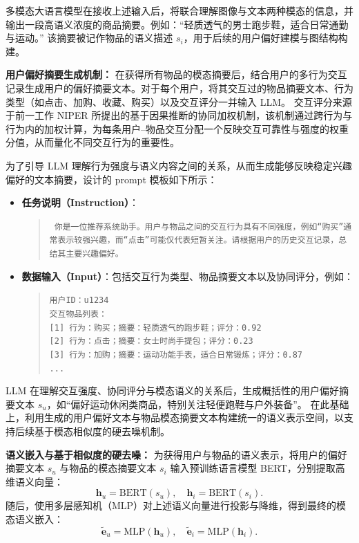 多模态大语言模型在接收上述输入后，将联合理解图像与文本两种模态的信息，并输出一段高语义浓度的商品摘要。例如：“轻质透气的男士跑步鞋，适合日常通勤与运动。”  
该摘要被记作物品的语义描述 $s_i$，用于后续的用户偏好建模与图结构构建。

\textbf{用户偏好摘要生成机制：}  
在获得所有物品的模态摘要后，结合用户的多行为交互记录生成用户的偏好摘要文本。对于每个用户，将其交互过的物品摘要文本、行为类型（如点击、加购、收藏、购买）以及交互评分一并输入 LLM。  
交互评分来源于前一工作 NIPER 所提出的基于因果推断的协同加权机制，该机制通过跨行为与行为内的加权计算，为每条用户–物品交互分配一个反映交互可靠性与强度的权重分值，从而量化不同交互行为的重要性。

为了引导 LLM 理解行为强度与语义内容之间的关系，从而生成能够反映稳定兴趣偏好的文本摘要，设计的 prompt 模板如下所示：
\begin{itemize}
    \item \textbf{任务说明（Instruction）}：
    \begin{quote}
        \texttt{
        你是一位推荐系统助手。用户与物品之间的交互行为具有不同强度，例如“购买”通常表示较强兴趣，而“点击”可能仅代表短暂关注。请根据用户的历史交互记录，总结其主要兴趣偏好。
        }
    \end{quote}

    \item \textbf{数据输入（Input）}：包括交互行为类型、物品摘要文本以及协同评分，例如：
    \begin{quote}
        \texttt{用户ID：u1234}\\
        \texttt{交互物品列表：}\\
        \texttt{[1] 行为：购买；摘要：轻质透气的跑步鞋；评分：0.92}\\
        \texttt{[2] 行为：点击；摘要：女士时尚手提包；评分：0.23}\\
        \texttt{[3] 行为：加购；摘要：运动功能手表，适合日常锻炼；评分：0.87}\\
        \texttt{...}
    \end{quote}
\end{itemize}

LLM 在理解交互强度、协同评分与模态语义的关系后，生成概括性的用户偏好摘要文本 $s_u$，如“偏好运动休闲类商品，特别关注轻便跑鞋与户外装备”。  
在此基础上，利用生成的用户偏好文本与物品模态摘要文本构建统一的语义表示空间，以支持后续基于模态相似度的硬去噪机制。

\textbf{语义嵌入与基于相似度的硬去噪：}  
为获得用户与物品的语义表示，将用户的偏好摘要文本 $s_u$ 与物品的模态摘要文本 $s_i$ 输入预训练语言模型 BERT，分别提取高维语义向量：
\begin{equation}
\mathbf{h}_u = \mathrm{BERT}(s_u), \quad \mathbf{h}_i = \mathrm{BERT}(s_i).
\end{equation}
随后，使用多层感知机（MLP）对上述语义向量进行投影与降维，得到最终的模态语义嵌入：
\begin{equation}
\widetilde{\mathbf{e}}_u = \mathrm{MLP}(\mathbf{h}_u), \quad
\widetilde{\mathbf{e}}_i = \mathrm{MLP}(\mathbf{h}_i).
\end{equation}

